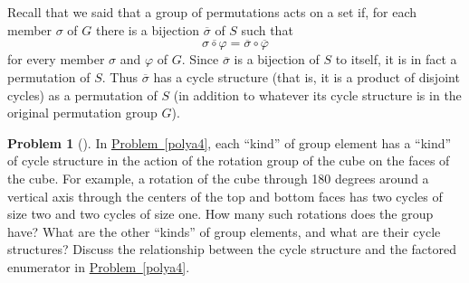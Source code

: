 \documentclass[10pt,]{book}
\theoremstyle{plain}
\theoremstyle{definition}
\newtheorem{activity}[project]{Problem}
\theoremstyle{definition}
\numberwithin{equation}{chapter}
\begin{document}
\hypertarget{p-1766}{}%
Recall that we said that a group of permutations acts on a set if, for each member \(\sigma\) of \(G\) there is a bijection \(\overline{\sigma}\) of \(S\) such that%
\begin{equation*}
\overline{\sigma\circ\varphi} = \overline{\sigma}\circ\overline{\varphi}
\end{equation*}
for every member \(\sigma\) and \(\varphi\) of \(G\). Since \(\overline{\sigma}\) is a bijection of \(S\) to itself, it is in fact a permutation of \(S\). Thus \(\overline{\sigma}\) has a cycle structure (that is, it is a product of disjoint cycles) as a permutation of \(S\) (in addition to whatever its cycle structure is in the original permutation group \(G\)).%
\begin{activity}[] \label{activity-319}
\hypertarget{p-1767}{}%
In \hyperref[polya4]{Problem~\ref{polya4}}, each ``kind'' of group element has a ``kind'' of cycle structure in the action of the rotation group of the cube on the faces of the cube. For example, a rotation of the cube through 180 degrees around a vertical axis through the centers of the top and bottom faces has two cycles of size two and two cycles of size one. How many such rotations does the group have? What are the other ``kinds'' of group elements, and what are their cycle structures? Discuss the relationship between the cycle structure and the factored enumerator in \hyperref[polya4]{Problem~\ref{polya4}}.%
\end{activity}
\end{document}
